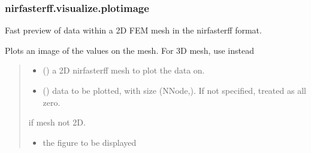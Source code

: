 \documentclass[letterpaper,10pt,english]{sphinxmanual}
\begin{document}
\sphinxstepscope


\subsubsection{nirfasterff.visualize.plotimage}
\label{\detokenize{_autosummary/nirfasterff.visualize.plotimage:nirfasterff-visualize-plotimage}}\label{\detokenize{_autosummary/nirfasterff.visualize.plotimage::doc}}

\begin{fulllineitems}
\label{\detokenize{_autosummary/nirfasterff.visualize.plotimage:nirfasterff.visualize.plotimage}}
\pysigstartsignatures
\pysiglinewithargsret
{}
{\sphinxparamcomma {}}
{}
\pysigstopsignatures
\sphinxAtStartPar
Fast preview of data within a 2D FEM mesh in the nirfasterff format.

\sphinxAtStartPar
Plots an image of the values on the mesh. For 3D mesh, use {\hyperref[\detokenize{_autosummary/nirfasterff.visualize.plot3dmesh:nirfasterff.visualize.plot3dmesh}]{}} instead
\begin{quote}\begin{description}
\begin{itemize}
\item {} 
\sphinxAtStartPar
{} () \textendash{} a 2D nirfasterff mesh to plot the data on.

\item {} 
\sphinxAtStartPar
{} (\sphinxstyleliteralemphasis{\sphinxupquote{, }}) \textendash{} data to be plotted, with size (NNode,). If not specified, treated as all zero.

\end{itemize}

\sphinxAtStartPar
{} \textendash{} if mesh not 2D.

\sphinxAtStartPar
\begin{itemize}
\item {} 
\sphinxAtStartPar
{} \textendash{} the figure to be displayed


\end{itemize}
\end{description}
\end{quote}
\end{fulllineitems}
\end{document}
